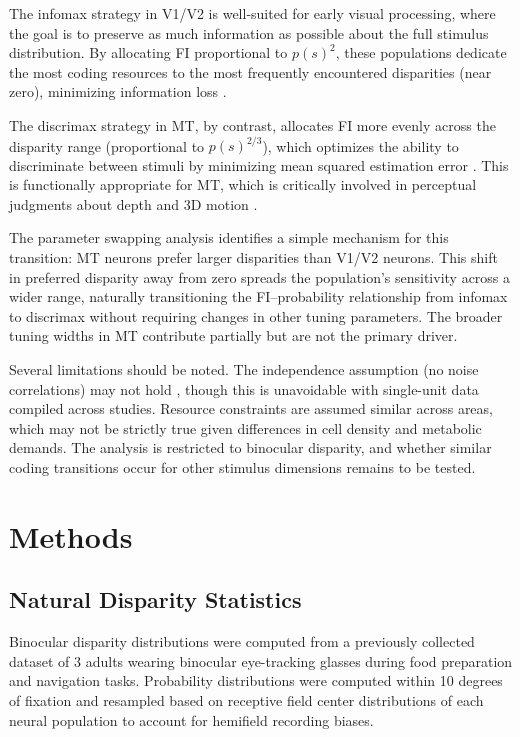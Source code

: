 \documentclass[11pt]{article}
\begin{document}
The infomax strategy in V1/V2 is well-suited for early visual processing, where the goal is to preserve as much information as possible about the full stimulus distribution. By allocating FI proportional to $p(s)^2$, these populations dedicate the most coding resources to the most frequently encountered disparities (near zero), minimizing information loss \citep{laughlin1981simple, barlow1961coding}.

The discrimax strategy in MT, by contrast, allocates FI more evenly across the disparity range (proportional to $p(s)^{2/3}$), which optimizes the ability to discriminate between stimuli by minimizing mean squared estimation error \citep{ganguli2012efficient}. This is functionally appropriate for MT, which is critically involved in perceptual judgments about depth and 3D motion \citep{deangelis1998cortical, czuba2014area}.

The parameter swapping analysis identifies a simple mechanism for this transition: MT neurons prefer larger disparities than V1/V2 neurons. This shift in preferred disparity away from zero spreads the population's sensitivity across a wider range, naturally transitioning the FI--probability relationship from infomax to discrimax without requiring changes in other tuning parameters. The broader tuning widths in MT contribute partially but are not the primary driver.

Several limitations should be noted. The independence assumption (no noise correlations) may not hold \citep{haefner2013inferring}, though this is unavoidable with single-unit data compiled across studies. Resource constraints are assumed similar across areas, which may not be strictly true given differences in cell density and metabolic demands. The analysis is restricted to binocular disparity, and whether similar coding transitions occur for other stimulus dimensions remains to be tested.

\section{Methods}

\subsection{Natural Disparity Statistics}

Binocular disparity distributions were computed from a previously collected dataset of 3 adults wearing binocular eye-tracking glasses during food preparation and navigation tasks. Probability distributions were computed within 10 degrees of fixation and resampled based on receptive field center distributions of each neural population to account for hemifield recording biases.
\end{document}
